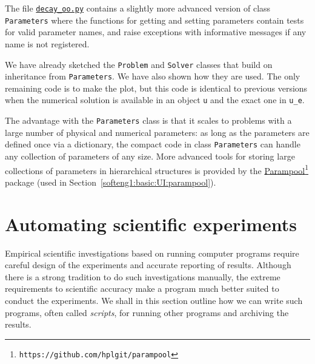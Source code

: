 \documentclass[graybox,sectrefs,envcountresetchap,open=right,final]{svmonodo}
\begin{document}
The file \href{{http://tinyurl.com/ofkw6kc/softeng/decay_oo.py}}{\nolinkurl{decay_oo.py}} contains
a slightly more advanced version of class \texttt{Parameters} where
the functions for getting and setting parameters
contain tests for valid parameter names, and
raise exceptions with informative messages if any name is not registered.

We have already sketched the \texttt{Problem} and \texttt{Solver} classes that build
on inheritance from \texttt{Parameters}. We have also shown how they are
used. The only remaining code is to make the plot, but this code is
identical to previous versions when the numerical solution is
available in an object \texttt{u} and the exact one in \Verb!u_e!.

The advantage with the \texttt{Parameters} class is that it scales to
problems with a large number of physical and numerical parameters: as
long as the parameters are defined once via a dictionary, the compact
code in class \texttt{Parameters} can handle any collection of parameters of
any size. More advanced tools for storing large collections of
parameters in hierarchical structures is provided by the
\href{{https://github.com/hplgit/parampool}}{Parampool}\footnote{\texttt{https://github.com/hplgit/parampool}} package
(used in Section~\ref{softeng1:basic:UI:parampool}).

\section{Automating scientific experiments}
\label{softeng1:experiments}

Empirical scientific investigations based on running computer programs
require careful design of the experiments and accurate reporting of results.
Although there is a strong tradition to do such investigations manually,
the extreme requirements to scientific accuracy make a program much
better suited to conduct the experiments. We shall in this section outline
how we can write such programs, often called \emph{scripts}, for running other
programs and archiving the results.
\end{document}
